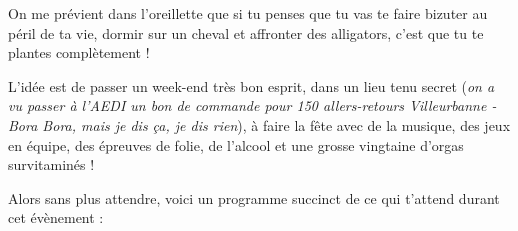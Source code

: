On me prévient dans l'oreillette que si tu penses que tu vas te faire bizuter au
péril de ta vie, dormir sur un cheval et affronter des alligators, c'est que tu
te plantes complètement !

L'idée est de passer un week-end très bon esprit, dans un lieu tenu secret
(\emph{on a
vu passer à l'AEDI un bon de commande pour 150 allers-retours
Villeurbanne - Bora Bora, mais je dis ça, je dis rien}), à faire la fête 
avec de la musique, des jeux en équipe, des épreuves de folie, de
l'alcool et une grosse vingtaine d'orgas survitaminés !

Alors sans plus attendre, voici un programme succinct de ce qui t'attend durant
cet évènement :
